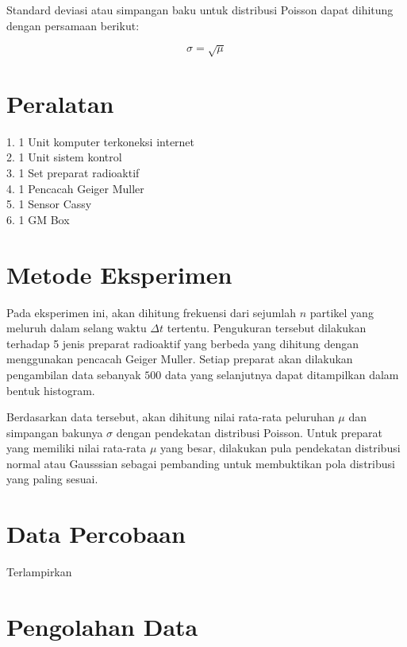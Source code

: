 \documentclass{article}
\begin{document}
		\par Standard deviasi atau simpangan baku untuk distribusi Poisson dapat dihitung dengan persamaan berikut: 
		
		\begin{equation}
			\sigma = \sqrt{\mu}
		\end{equation}
		
	\section*{Peralatan}
	1. 1 Unit komputer terkoneksi internet \\
	2. 1 Unit sistem kontrol \\ 
	3. 1 Set preparat radioaktif \\
	4. 1 Pencacah Geiger Muller \\
	5. 1 Sensor Cassy \\
	6. 1 GM Box \\
	
	\section*{Metode Eksperimen}
	
		\hspace{0.35 cm} Pada eksperimen ini, akan dihitung frekuensi dari sejumlah $n$ partikel yang meluruh dalam selang waktu $\Delta t$ tertentu. Pengukuran tersebut dilakukan terhadap 5 jenis preparat radioaktif yang berbeda yang dihitung dengan menggunakan pencacah Geiger Muller. Setiap preparat akan dilakukan pengambilan data sebanyak $500$ data yang selanjutnya dapat ditampilkan dalam bentuk histogram. 
		
		\par Berdasarkan data tersebut, akan dihitung nilai rata-rata peluruhan $\mu$ dan simpangan bakunya $\sigma$ dengan pendekatan distribusi Poisson. Untuk preparat yang memiliki nilai rata-rata $\mu$ yang besar, dilakukan pula pendekatan distribusi normal atau Gausssian sebagai pembanding untuk membuktikan pola distribusi yang paling sesuai. 
	
	\section*{Data Percobaan}
		
		Terlampirkan 
	
	\section*{Pengolahan Data}
		
\end{document}
